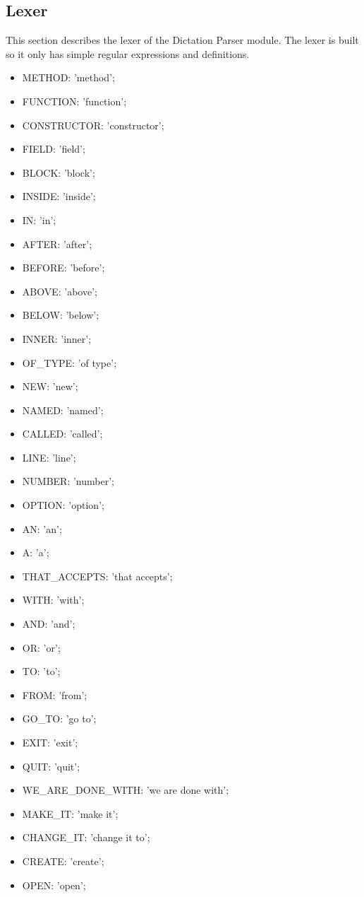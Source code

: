 \subsection{Lexer}
This section describes the lexer of the Dictation Parser module. The lexer is built so it only has simple regular expressions and definitions.
\begin{itemize}
	\item METHOD: 'method';
	\item FUNCTION: 'function';
	\item CONSTRUCTOR: 'constructor';
	\item FIELD: 'field';
	\item BLOCK: 'block';
	\item INSIDE: 'inside';
	\item IN: 'in';
	\item AFTER: 'after';
	\item BEFORE: 'before';
	\item ABOVE: 'above';
	\item BELOW: 'below';
	\item INNER: 'inner';
	\item OF\_TYPE: 'of type';
	\item NEW: 'new';
	\item NAMED: 'named';
	\item CALLED: 'called';
	\item LINE: 'line';
	\item NUMBER: 'number';
	\item OPTION: 'option';
	\item AN: 'an';
	\item A: 'a';
	\item THAT\_ACCEPTS: 'that accepts';
	\item WITH: 'with';
	\item AND: 'and';
	\item OR: 'or';
	\item TO: 'to';
	\item FROM: 'from';
	\item GO\_TO: 'go to';
	\item EXIT: 'exit';
	\item QUIT: 'quit';
	\item WE\_ARE\_DONE\_WITH: 'we are done with';
	\item MAKE\_IT: 'make it';
	\item CHANGE\_IT: 'change it to';
	\item CREATE: 'create';
	\item OPEN: 'open';

\end{itemize}
